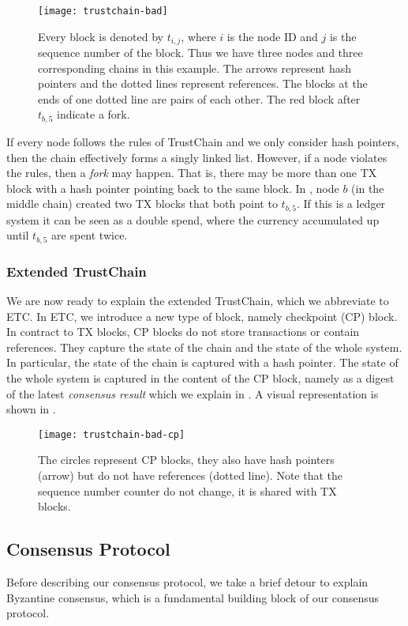 \begin{figure}
    \texttt{[image: trustchain-bad]}
    \centering
    \caption{Every block is denoted by $t_{i,j}$, where $i$ is the node ID and $j$ is the sequence number of the block.
    Thus we have three nodes and three corresponding chains in this example.
    The arrows represent hash pointers and the dotted lines represent references.
    The blocks at the ends of one dotted line are pairs of each other.
    The red block after $t_{b, 5}$ indicate a fork.}
    \label{fig:trustchain-bad}
\end{figure}

If every node follows the rules of TrustChain and we only consider hash pointers,
then the chain effectively forms a singly linked list.
However, if a node violates the rules, then a \emph{fork} may happen.
That is, there may be more than one TX block with a hash pointer pointing back to the same block.
In , node $b$ (in the middle chain) created two TX blocks that both point to $t_{b, 5}$.
If this is a ledger system it can be seen as a double spend, where the currency accumulated up until $t_{b, 5}$ are spent twice.

\subsubsection*{Extended TrustChain}
We are now ready to explain the extended TrustChain, which we abbreviate to ETC.
In ETC, we introduce a new type of block, namely checkpoint (CP) block.
In contract to TX blocks, CP blocks do not store transactions or contain references.
They capture the state of the chain and the state of the whole system.
In particular, the state of the chain is captured with a hash pointer.
The state of the whole system is captured in the content of the CP block,
namely as a digest of the latest \emph{consensus result} which we explain in .
A visual representation is shown in .

\begin{figure}
    \texttt{[image: trustchain-bad-cp]}
    \centering
    \caption{The circles represent CP blocks,
    they also have hash pointers (arrow) but do not have references (dotted line).
    Note that the sequence number counter do not change, it is shared with TX blocks.}
    \label{fig:trustchain-bad-cp}
\end{figure}

\subsection{Consensus Protocol}\label{sec:overview-cons}
Before describing our consensus protocol, we take a brief detour to explain Byzantine consensus,
which is a fundamental building block of our consensus protocol.

